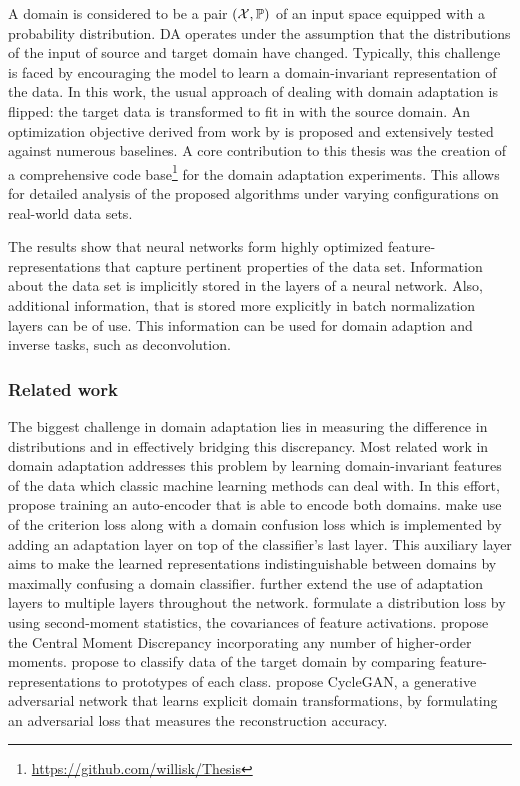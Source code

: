 A domain is considered to be a pair $(\mathcal X, \mathbb P)$ of an input space equipped with a probability distribution. DA operates under the assumption that the distributions of
the input of source and target domain have changed.
Typically, this challenge is faced by encouraging the model to learn a domain-invariant
representation of the data.
In this work, the usual approach of dealing with domain adaptation is flipped: 
the target data is transformed to fit in with the source domain.
An optimization objective derived from work by \cite{DeepInversion} 
is proposed and
extensively tested against numerous baselines.
A core contribution to this thesis was the creation of a comprehensive code
base\footnote{\url{https://github.com/willisk/Thesis}} for the domain adaptation experiments.  This 
allows for detailed analysis of the proposed algorithms under varying configurations 
on real-world data sets.

The results show that neural networks form highly optimized feature-representations 
that capture pertinent properties of the data set.
Information about the data set is implicitly stored in the layers of a neural network.
Also, additional information, that is stored more explicitly in batch normalization layers
can be of use.
This information can be used for domain adaption and inverse tasks, such as deconvolution.


\subsubsection{Related work}

The biggest challenge in domain adaptation lies in measuring the difference in distributions
and in effectively bridging this discrepancy.
Most related work in domain adaptation
addresses this problem by learning domain-invariant features of the data
which classic machine learning methods can deal with.
In this effort, \cite{DA_AE} propose training an auto-encoder that is able to encode both domains.
\cite{DA_Deep_Transfer} make use of the criterion loss along with a domain confusion loss 
which is implemented by adding an adaptation layer on top of the classifier's last layer.
This auxiliary layer aims to make the learned representations indistinguishable 
between domains by maximally confusing a domain classifier.
\cite{DA_MMD} further extend the use of adaptation layers to multiple layers throughout the network.
\cite{Deep_Coral} formulate a distribution loss by using second-moment statistics, 
the covariances of feature activations.
\cite{DA_CMD} propose the Central Moment Discrepancy incorporating any number of higher-order moments.
\cite{DA_Prototypes} propose to classify data of the target domain by comparing 
feature-representations to prototypes of each class.
\cite{DA_CycleGAN} propose CycleGAN, a generative adversarial network that learns 
explicit domain transformations, by formulating an adversarial loss
that measures the reconstruction accuracy.


